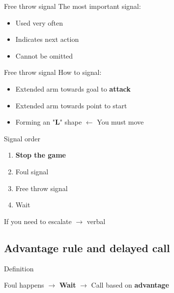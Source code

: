 \documentclass{beamer}
\begin{document}
	\begin{frame}{Free throw signal}
		The most important signal:
		\begin{itemize}
			\item Used very often
			\item Indicates next action
			\item Cannot be omitted
		\end{itemize}
	\end{frame}

	\begin{frame}{Free throw signal}
		How to signal:
		\begin{itemize}
			\item Extended arm towards goal to \textbf{attack}
			\item Extended arm towards point to start

			\pause

			\item Forming an "\textbf{L}" shape \pause $\leftarrow$ You must move
		\end{itemize}
	\end{frame}

	\begin{frame}{Signal order}
		\begin{enumerate}
			\item \textbf{Stop the game}\pause
			\item Foul signal
			\item Free throw signal
			\item Wait
		\end{enumerate}

		\pause

		If you need to escalate $\rightarrow$ verbal
	\end{frame}

	\subsection{Advantage rule and delayed call}

	\begin{frame}{Definition}
		\begin{center}
			Foul happens \pause
			$\rightarrow$ \textbf{Wait} \pause
			$\rightarrow$ Call based on \textbf{advantage}
		\end{center}
	\end{frame}
\end{document}
